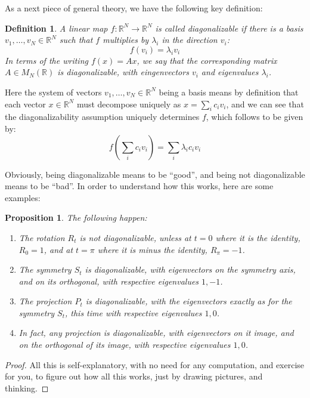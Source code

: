 \documentclass[12pt]{amsbook}
\newtheorem{definition}[theorem]{Definition}
\newtheorem{proposition}[theorem]{Proposition}
\begin{document}
As a next piece of general theory, we have the following key definition:


\begin{definition}
A linear map $f:\mathbb R^N\to\mathbb R^N$ is called diagonalizable if there is a basis  $v_1,\ldots,v_N\in\mathbb R^N$ such that $f$ multiplies by $\lambda_i$ in the direction $v_i$:
$$f(v_i)=\lambda_iv_i$$
In terms of the writing $f(x)=Ax$, we say that the corresponding matrix $A\in M_N(\mathbb R)$ is diagonalizable, with eingenvectors $v_i$ and eigenvalues $\lambda_i$.
\end{definition}

Here the system of vectors $v_1,\ldots,v_N\in\mathbb R^N$ being a basis means by definition that each vector $x\in\mathbb R^N$ must decompose uniquely as $x=\sum_ic_iv_i$, and we can see that the diagonalizability assumption uniquely determines $f$, which follows to be given by:
$$f\left(\sum_ic_iv_i\right)=\sum_i\lambda_ic_iv_i$$

Obviously, being diagonalizable means to be ``good'', and being not diagonalizable means to be ``bad''. In order to understand how this works, here are some examples:

\begin{proposition}
The following happen:
\begin{enumerate}
\item The rotation $R_t$ is not diagonalizable, unless at $t=0$ where it is the identity, $R_0=1$, and at $t=\pi$ where it is minus the identity, $R_\pi=-1$.

\item The symmetry $S_t$ is diagonalizable, with eigenvectors on the symmetry axis, and on its orthogonal, with respective eigenvalues $1,-1$.

\item The projection $P_t$ is diagonalizable, with the eigenvectors exactly as for the symmetry $S_t$, this time with respective eigenvalues $1,0$.

\item In fact, any projection is diagonalizable, with eigenvectors on it image, and on the orthogonal of its image, with respective eigenvalues $1,0$.
\end{enumerate}
\end{proposition}

\begin{proof}
All this is self-explanatory, with no need for any computation, and exercise for you, to figure out how all this works, just by drawing pictures, and thinking.
\end{proof}
\end{document}
